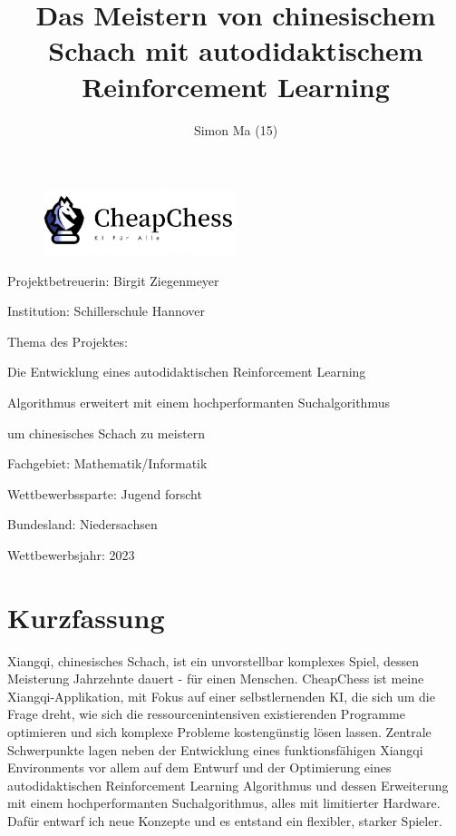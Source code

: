 \documentclass{jpp}
\title{Das Meistern von chinesischem Schach mit autodidaktischem Reinforcement Learning}
\author{Simon Ma (15)\aff{1}
  \corresp{\email{simon.mama07@gmail.com}}
  }
\affiliation{\aff{1}Schillerschule Hannover,
Ebellstr. 15, 30629 Hannover, Germany}
\begin{document}
\begin{figure}
\centering
\includegraphics[width={0.5\textwidth}]{imgs/loogo.png}
\end{figure}
\maketitle


Projektbetreuerin: Birgit Ziegenmeyer

Institution: Schillerschule Hannover

Thema des Projektes:

Die Entwicklung eines autodidaktischen Reinforcement Learning 

Algorithmus erweitert mit einem hochperformanten Suchalgorithmus 

um chinesisches Schach zu meistern

Fachgebiet: Mathematik/Informatik

Wettbewerbssparte: Jugend forscht

Bundesland: Niedersachsen

Wettbewerbsjahr: 2023

\newpage

\tableofcontents

\newpage

\section{Kurzfassung}
Xiangqi, chinesisches Schach, ist ein unvorstellbar komplexes Spiel, dessen Meisterung Jahrzehnte dauert - für einen Menschen. CheapChess ist meine Xiangqi-Applikation, mit Fokus auf einer selbstlernenden KI, die sich um die Frage dreht, wie sich die ressourcenintensiven existierenden Programme optimieren und sich komplexe Probleme kostengünstig lösen lassen. Zentrale Schwerpunkte lagen neben der Entwicklung eines funktionsfähigen Xiangqi Environments vor allem auf dem Entwurf und der Optimierung eines autodidaktischen Reinforcement Learning Algorithmus und dessen Erweiterung mit einem hochperformanten Suchalgorithmus, alles mit limitierter Hardware. Dafür entwarf ich neue Konzepte und es entstand ein flexibler, starker Spieler.
\end{document}
